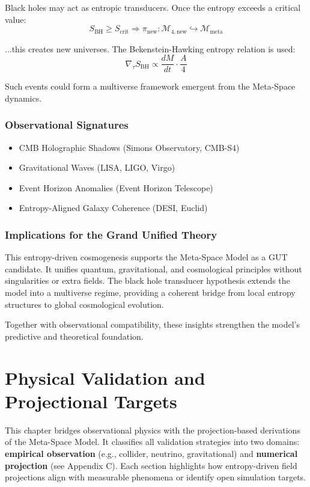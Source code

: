 \documentclass[10.5pt,a4paper]{article}
\begin{document}
Black holes may act as entropic transducers. Once the entropy exceeds a critical value:
\[
S_{\text{BH}} \geq S_{\text{crit}} \Rightarrow \pi_{\text{new}}: \mathcal{M}_{4,\text{new}} \hookrightarrow \mathcal{M}_{\text{meta}}
\]

...this creates new universes. The Bekenstein-Hawking entropy relation is used:
\[
\nabla_\tau S_{\text{BH}} \propto \frac{dM}{dt} \cdot \frac{A}{4}
\]

Such events could form a multiverse framework emergent from the Meta-Space dynamics.

\subsubsection{Observational Signatures}

\begin{itemize}
    \item CMB Holographic Shadows (Simons Observatory, CMB-S4)
    \item Gravitational Waves (LISA, LIGO, Virgo)
    \item Event Horizon Anomalies (Event Horizon Telescope)
    \item Entropy-Aligned Galaxy Coherence (DESI, Euclid)
\end{itemize}

\subsubsection{Implications for the Grand Unified Theory}

This entropy-driven cosmogenesis supports the Meta-Space Model as a GUT candidate. It unifies quantum, gravitational, and cosmological principles without singularities or extra fields. The black hole transducer hypothesis extends the model into a multiverse regime, providing a coherent bridge from local entropy structures to global cosmological evolution.

Together with observational compatibility, these insights strengthen the model’s predictive and theoretical foundation.

\clearpage

\section{Physical Validation and Projectional Targets}

This chapter bridges observational physics with the projection-based derivations of the Meta-Space Model. It classifies all validation strategies into two domains: \textbf{empirical observation} (e.g., collider, neutrino, gravitational) and \textbf{numerical projection} (see Appendix C). Each section highlights how entropy-driven field projections align with measurable phenomena or identify open simulation targets.
\end{document}
